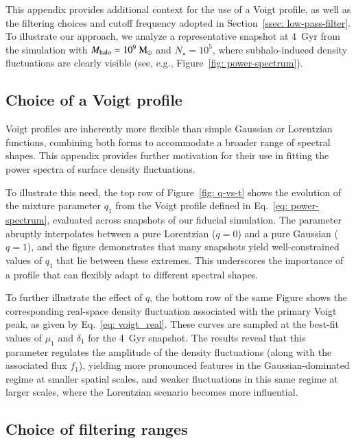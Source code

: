 \documentclass[fleqn,usenatbib]{mnras}
\newcommand{\msun}{\rm M_\odot}
\begin{document}
This appendix provides additional context for the use of a Voigt profile, as well as the filtering choices and cutoff frequency adopted in Section~\ref{ssec: low-pass-filter}. To illustrate our approach, we analyze a representative snapshot at 4~Gyr from the simulation with $M_{\rm halo} = 10^{9}~\msun$ and $N_{\star} = 10^{5}$, where subhalo-induced density fluctuations are clearly visible (see, e.g., Figure~\ref{fig: power-spectrum}).

\subsection{Choice of a Voigt profile} \label{app: voigt-mixture}

Voigt profiles are inherently more flexible than simple Gaussian or Lorentzian functions, combining both forms to accommodate a broader range of spectral shapes. This appendix provides further motivation for their use in fitting the power spectra of surface density fluctuations.

To illustrate this need, the top row of Figure~\ref{fig: q-vs-t} shows the evolution of the mixture parameter $q_{1}$ from the Voigt profile defined in Eq.~\ref{eq: power-spectrum}, evaluated across snapshots of our fiducial simulation. The parameter abruptly interpolates between a pure Lorentzian ($q = 0$) and a pure Gaussian ($q = 1$), and the figure demonstrates that many snapshots yield well-constrained values of $q_{1}$ that lie between these extremes. This underscores the importance of a profile that can flexibly adapt to different spectral shapes.

To further illustrate the effect of $q$, the bottom row of the same Figure shows the corresponding real-space density fluctuation associated with the primary Voigt peak, as given by Eq.~\ref{eq: voigt_real}. These curves are sampled at the best-fit values of $\mu_{1}$ and $\delta_{1}$ for the 4~Gyr snapshot. The results reveal that this parameter regulates the amplitude of the density fluctuations (along with the associated flux $f_{1}$), yielding more pronounced features in the Gaussian-dominated regime at smaller spatial scales, and weaker fluctuations in this same regime at larger scales, where the Lorentzian scenario becomes more influential.

\subsection{Choice of filtering ranges} \label{app: chi-reconstruct}
\end{document}
